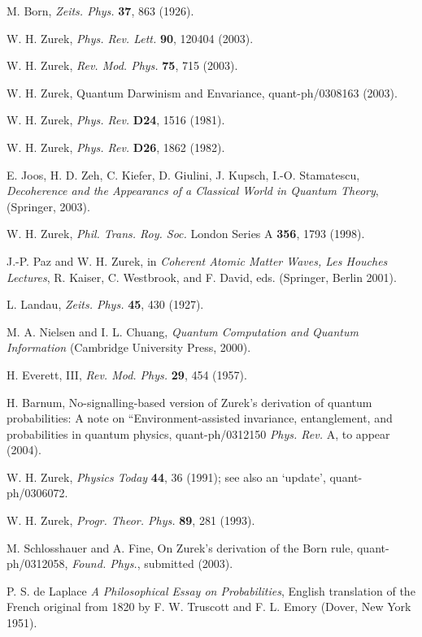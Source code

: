 \documentclass[aps,twocolumn,pra,epsfig]{revtex4}
\begin{document}
\bigskip


\medskip

\noindent[1] M. Born, {\it Zeits. Phys.} {\bf 37}, 863 (1926).

\noindent[2] W. H. Zurek, {\it Phys. Rev. Lett.} {\bf 90}, 120404 (2003).

\noindent[3] W. H. Zurek, {\it Rev. Mod. Phys.} {\bf 75}, 715 (2003).

\noindent[4] W. H. Zurek, Quantum Darwinism and Envariance, 
quant-ph/0308163 (2003).

\noindent[5] W. H. Zurek, {\it Phys. Rev.} {\bf D24}, 1516 (1981).

\noindent[6] W. H. Zurek, {\it Phys. Rev.} {\bf D26}, 1862 (1982).

\noindent[7] E. Joos, H. D. Zeh, C. Kiefer, D. Giulini, J. Kupsch, 
I.-O. Stamatescu, {\it Decoherence and the Appearancs of 
a Classical World in Quantum Theory}, (Springer, 2003).

\noindent[8] W. H. Zurek, {\it Phil. Trans. Roy. Soc.} London Series A 
{\bf 356}, 1793 (1998).

\noindent[9] J.-P. Paz and W. H. Zurek, in {\it Coherent Atomic Matter Waves, 
Les Houches Lectures}, R. Kaiser, C. Westbrook, and F. David, eds.
(Springer, Berlin 2001).

\noindent[10] L. Landau, {\it Zeits. Phys.} {\bf 45}, 430 (1927). 

\noindent[11] M. A. Nielsen and I. L. Chuang, {\it Quantum Computation 
and Quantum Information} (Cambridge University Press, 2000).

\noindent[12] H. Everett, III, {\it Rev. Mod. Phys.} {\bf 29}, 454 (1957).

\noindent[13] H. Barnum, No-signalling-based version of Zurek's derivation 
of quantum probabilities: A note on ``Environment-assisted invariance,
entanglement, and probabilities in quantum physics, quant-ph/0312150
{\it Phys. Rev.} A, to appear (2004).

\noindent[14] W. H. Zurek, {\it Physics Today} {\bf 44}, 36 (1991); see also
an `update', quant-ph/0306072.

\noindent[15] W. H. Zurek, {\it Progr. Theor. Phys.} {\bf 89}, 281 (1993).

\noindent[16] M. Schlosshauer and A. Fine, On Zurek's derivation
 of the Born rule, quant-ph/0312058, {\it Found. Phys.}, submitted (2003).

\noindent[17] P. S. de Laplace {\it A Philosophical Essay on Probabilities},
English translation of the French original from 1820 
by F. W. Truscott and F. L. Emory (Dover, New York 1951).
\end{document}
